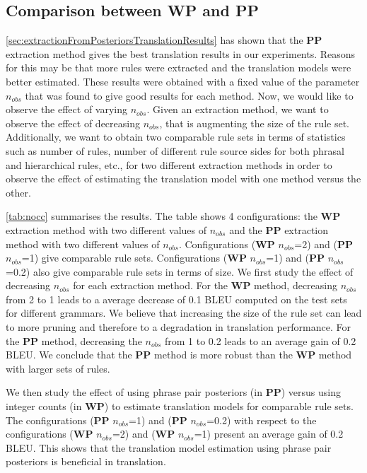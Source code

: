 \subsection{Comparison between {\bf WP} and {\bf PP}}
\label{sec:extractionFromPosteriorsComparisonWPPP}

\autoref{sec:extractionFromPosteriorsTranslationResults} has shown that the
{\bf PP} extraction method gives the best translation results
in our experiments. Reasons for
this may be that more rules were extracted and the translation models were
better estimated. These results were obtained with a fixed value of the
parameter $n_{obs}$ that was found to give good results for each method. Now, we
would like to observe the effect of varying $n_{obs}$. Given an extraction
method, we want to observe the effect of decreasing $n_{obs}$, that is
augmenting the size of the rule set. Additionally, we want to obtain two
comparable rule sets in terms of statistics such as number of rules, number of
different rule source sides for both phrasal and hierarchical rules, etc., for
two different extraction methods in order to observe the effect of estimating
the translation model with one method versus the other.

\autoref{tab:nocc} summarises the results.
The table shows 4 configurations: the {\bf WP}
extraction method with two different values of $n_{obs}$ and the {\bf PP}
extraction method with two different values of $n_{obs}$. Configurations
({\bf WP} $n_{obs}$=2) and ({\bf PP} $n_{obs}$=1) give comparable rule sets.
Configurations ({\bf WP} $n_{obs}$=1) and ({\bf PP} $n_{obs}$=0.2) also give
comparable rule sets in terms of size. We
first study the effect of decreasing $n_{obs}$ for each
extraction method. For the {\bf WP} method, decreasing $n_{obs}$ from 2 to 1
leads to a average decrease of 0.1 BLEU computed on the test sets for different
grammars. We believe that increasing the size of the rule set can lead to more
pruning and therefore to a degradation in translation performance. For the
{\bf PP} method, decreasing the $n_{obs}$ from 1 to 0.2 leads to an average gain
of 0.2 BLEU. We conclude that the {\bf PP} method is more robust than the
{\bf WP} method with larger sets of rules.

We then study the effect of using phrase pair posteriors (in {\bf PP}) versus
using integer counts (in {\bf WP}) to estimate translation models for comparable
rule sets. The configurations ({\bf PP} $n_{obs}$=1) and
({\bf PP} $n_{obs}$=0.2) with respect to the configurations
({\bf WP} $n_{obs}$=2) and ({\bf WP} $n_{obs}$=1) present an average gain of
0.2 BLEU. This shows that the translation model estimation using phrase pair
posteriors is beneficial in translation.

